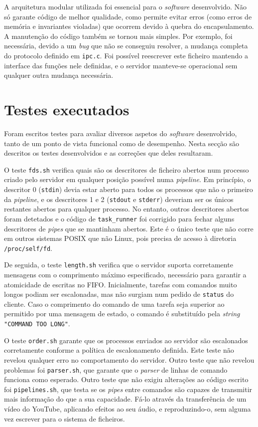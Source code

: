 \documentclass[11pt]{article}
\begin{document}
A arquitetura modular utilizada foi essencial para o \emph{software} desenvolvido. Não só garante
código de melhor qualidade, como permite evitar erros (como erros de memória e invariantes violadas)
que ocorrem devido à quebra do encapsulamento. A manutenção do código também se tornou mais simples.
Por exemplo, foi necessária, devido a um \emph{bug} que não se conseguiu resolver, a mudança
completa do protocolo definido em \texttt{ipc.c}. Foi possível reescrever este ficheiro mantendo a
interface das funções nele definidas, e o servidor manteve-se operacional sem qualquer outra mudança
necessária.

\section{Testes executados}

Foram escritos testes para avaliar diversos aspetos do \emph{software} desenvolvido, tanto de um
ponto de vista funcional como de desempenho. Nesta secção são descritos os testes desenvolvidos e
as correções que deles resultaram.

O teste \texttt{fds.sh} verifica quais são os descritores de ficheiro abertos num processo criado
pelo servidor em qualquer posição possível numa \emph{pipeline}. Em princípio, o descritor 0
(\texttt{stdin}) devia estar aberto para todos os processos que não o primeiro da \emph{pipeline}, e
os descritores 1 e 2 (\texttt{stdout} e \texttt{stderr}) deveriam ser os únicos restantes abertos
para qualquer processo. No entanto, outros descritores abertos foram detetados e o código de
\texttt{task\_runner} foi corrigido para fechar alguns descritores de \emph{pipes} que se mantinham
abertos. Este é o único teste que não corre em outros sistemas POSIX que não Linux, pois precisa de
acesso à diretoria \texttt{/proc/self/fd}.

De seguida, o teste \texttt{length.sh} verifica que o servidor suporta corretamente mensagens com o
comprimento máximo especificado, necessário para garantir a atomicidade de escritas no FIFO.
Inicialmente, tarefas com comandos muito longos podiam ser escalonadas, mas não surgiam num pedido
de \texttt{status} do cliente. Caso o comprimento do comando de uma tarefa seja superior ao
permitido por uma mensagem de estado, o comando é substituído pela \emph{string}
\texttt{"COMMAND TOO LONG"}.

O teste \texttt{order.sh} garante que os processos enviados ao servidor são escalonados corretamente
conforme a política de escalonamento definida. Este teste não revelou qualquer erro no comportamento
do servidor. Outro teste que não revelou problemas foi \texttt{parser.sh}, que garante que o
\emph{parser} de linhas de comando funciona como esperado. Outro teste que não exigiu alterações ao
código escrito foi \texttt{pipelines.sh}, que testa se os \emph{pipes} entre comandos são capazes de
transmitir mais informação do que a sua capacidade. Fá-lo através da transferência de um vídeo do
YouTube, aplicando efeitos ao seu áudio, e reproduzindo-o, sem alguma vez escrever para o sistema de
ficheiros.
\end{document}
